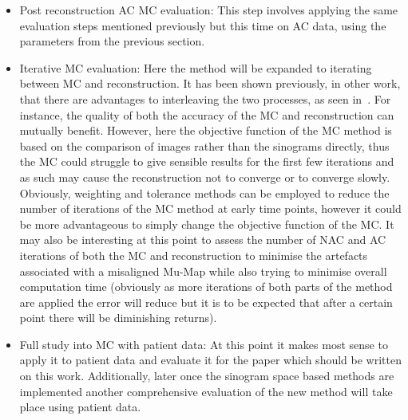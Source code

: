 \begin{itemize}
                \item Post reconstruction \gls{AC} \gls{MC} evaluation: This step involves applying the same evaluation steps mentioned previously but this time on \gls{AC} data, using the parameters from the previous section. 
    
                \item Iterative \gls{MC} evaluation: Here the method will be expanded to iterating between \gls{MC} and reconstruction. It has been shown previously, in other work, that there are advantages to interleaving the two processes, as seen in~. For instance, the quality of both the accuracy of the \gls{MC} and reconstruction can mutually benefit. However, here the objective function of the \gls{MC} method is based on the comparison of images rather than the sinograms directly, thus the \gls{MC} could struggle to give sensible results for the first few iterations and as such may cause the reconstruction not to converge or to converge slowly. Obviously, weighting and tolerance methods can be employed to reduce the number of iterations of the \gls{MC} method at early time points, however it could be more advantageous to simply change the objective function of the \gls{MC}. It may also be interesting at this point to assess the number of \gls{NAC} and \gls{AC} iterations of both the \gls{MC} and reconstruction to minimise the artefacts associated with a misaligned \gls{Mu-Map} while also trying to minimise overall computation time (obviously as more iterations of both parts of the method are applied the error will reduce but it is to be expected that after a certain point there will be diminishing returns).
    
                \item Full study into \gls{MC} with patient data: At this point it makes most sense to apply it to patient data and evaluate it for the paper which should be written on this work. Additionally, later once the sinogram space based methods are implemented another comprehensive evaluation of the new method will take place using patient data.
    

\end{itemize}
